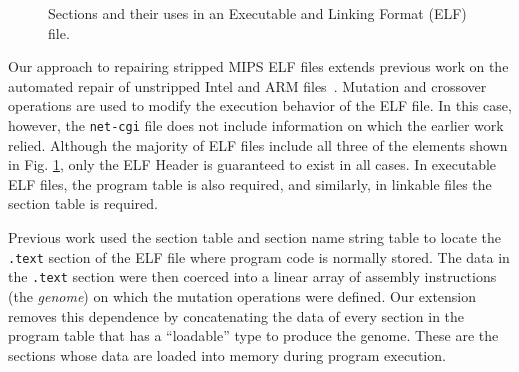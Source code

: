 \documentclass{sigcomm-alternate}
\begin{document}
\begin{figure}[htb]
  \centering
\caption{\label{elf}Sections and their uses in an Executable and
  Linking Format (ELF) file.}
\end{figure}

Our approach to repairing stripped MIPS ELF files extends
previous work on the automated repair of unstripped Intel and ARM
files~\cite{schulte2013embedded}. 
Mutation and crossover operations are used to modify the
execution behavior of the ELF file.  In this case, however, the \texttt{net-cgi} file
does not include information on which
the earlier work relied.
 Although the majority of ELF files include all three of the elements
shown in Fig. \ref{elf}, only the ELF Header is guaranteed to exist in
all cases.  In executable ELF files, the program table is also required, and
similarly, in linkable files the section table is required.

Previous work used the section table and section name string table to
locate the \texttt{.text} section of the ELF file where program code
is normally stored.  The data in the \texttt{.text} section were then
coerced into a linear array of assembly instructions (the
\emph{genome}) on which the mutation operations were defined.  Our
extension removes this dependence by concatenating the data of every
section in the program table that has a ``loadable'' type to produce
the genome.  These are the sections whose data are loaded into memory
during program execution.
\end{document}
